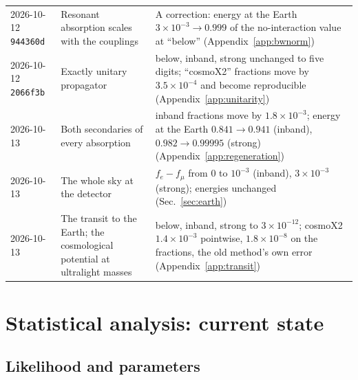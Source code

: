 \documentclass[11pt,a4paper]{article}
\begin{document}
\begin{table}[h]
\begin{tabular}{p{2.0cm}p{4.8cm}p{7.4cm}}
2026-10-12 \texttt{944360d} & Resonant absorption scales with the couplings & A correction: energy at the Earth $3\times10^{-3}\to0.999$ of the no-interaction value at ``below'' (Appendix~\ref{app:bwnorm}) \\
2026-10-12 \texttt{2066f3b} & Exactly unitary propagator & below, inband, strong unchanged to five digits; ``cosmoX2'' fractions move by $3.5\times10^{-4}$ and become reproducible (Appendix~\ref{app:unitarity}) \\
2026-10-13 & Both secondaries of every absorption & inband fractions move by $1.8\times10^{-3}$; energy at the Earth $0.841\to0.941$ (inband), $0.982\to0.99995$ (strong) (Appendix~\ref{app:regeneration}) \\
2026-10-13 & The whole sky at the detector & $f_e - f_\mu$ from $0$ to $10^{-3}$ (inband), $3\times10^{-3}$ (strong); energies unchanged (Sec.~\ref{sec:earth}) \\
2026-10-13 & The transit to the Earth; the cosmological potential at ultralight masses & below, inband, strong to $3\times10^{-12}$; cosmoX2 $1.4\times10^{-3}$ pointwise, $1.8\times10^{-8}$ on the fractions, the old method's own error (Appendix~\ref{app:transit}) \\
\bottomrule
\end{tabular}
\end{table}

\section{Statistical analysis: current state}
\label{sec:stats}

\subsection{Likelihood and parameters}
\end{document}
